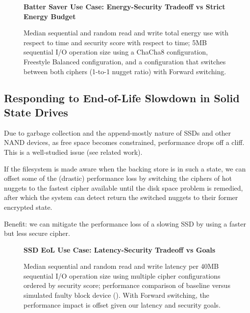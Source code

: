 
\begin{figure}[ht] \textbf{Batter Saver Use Case: Energy-Security Tradeoff vs
   Strict Energy Budget}\par\medskip
   \centering
   {} \caption{Median sequential and random
   read and write total energy use with respect to time and security score with
   respect to time; 5MB sequential I/O operation size using a ChaCha8
   configuration, Freestyle Balanced configuration, and a configuration that
   switches between both ciphers (1-to-1 nugget ratio) with Forward switching.}
  \label{fig:usecase-battery}
\end{figure}

\subsection{Responding to End-of-Life Slowdown in Solid State Drives}

Due to garbage collection and the append-mostly nature of SSDs and other NAND
devices, as free space becomes constrained, performance drops off a cliff. This
is a well-studied issue (see related work).

If the filesystem is made aware when the backing store is in such a state, we
can offset some of the (drastic) performance loss by switching the ciphers of
hot nuggets to the fastest cipher available until the disk space problem is
remedied, after which the system can detect return the switched nuggets to their
former encrypted state.

Benefit: we can mitigate the performance loss of a slowing SSD by using a faster
but less secure cipher.

\begin{figure}[ht] \textbf{SSD EoL Use Case: Latency-Security Tradeoff vs
   Goals}\par\medskip
   \centering
   {} \caption{Median sequential and
   random read and write latency per 40MB sequential I/O operation size using
   multiple cipher configurations ordered by security score; performance
   comparison of baseline versus simulated faulty block device (). With Forward switching, the performance impact is
   offset given our latency and security goals.}
  \label{fig:usecase-eol-tradeoff}
\end{figure}

